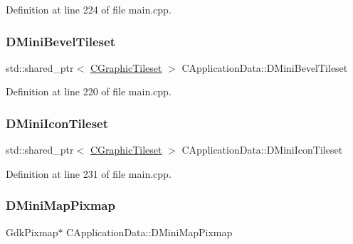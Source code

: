 Definition at line 224 of file main.\+cpp.

\hypertarget{classCApplicationData_a74527a373eef061540615e61928f9706}{}\label{classCApplicationData_a74527a373eef061540615e61928f9706} 
\subsubsection{\texorpdfstring{D\+Mini\+Bevel\+Tileset}{DMiniBevelTileset}}
{\footnotesize\ttfamily std\+::shared\+\_\+ptr$<$ \hyperlink{classCGraphicTileset}{C\+Graphic\+Tileset} $>$ C\+Application\+Data\+::\+D\+Mini\+Bevel\+Tileset\hspace{0.3cm}{\ttfamily [protected]}}



Definition at line 220 of file main.\+cpp.

\hypertarget{classCApplicationData_aa7d7e4c8be514246089546f4d98d74f2}{}\label{classCApplicationData_aa7d7e4c8be514246089546f4d98d74f2} 
\subsubsection{\texorpdfstring{D\+Mini\+Icon\+Tileset}{DMiniIconTileset}}
{\footnotesize\ttfamily std\+::shared\+\_\+ptr$<$ \hyperlink{classCGraphicTileset}{C\+Graphic\+Tileset} $>$ C\+Application\+Data\+::\+D\+Mini\+Icon\+Tileset\hspace{0.3cm}{\ttfamily [protected]}}



Definition at line 231 of file main.\+cpp.

\hypertarget{classCApplicationData_abe3af81659ead5113b7b2f165a88e737}{}\label{classCApplicationData_abe3af81659ead5113b7b2f165a88e737} 
\subsubsection{\texorpdfstring{D\+Mini\+Map\+Pixmap}{DMiniMapPixmap}}
{\footnotesize\ttfamily Gdk\+Pixmap$\ast$ C\+Application\+Data\+::\+D\+Mini\+Map\+Pixmap\hspace{0.3cm}{\ttfamily [protected]}}



